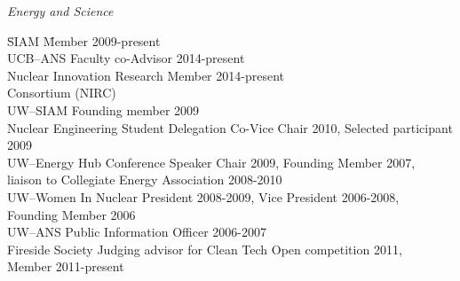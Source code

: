 \textit{Energy and Science}
\begin{tabbing}
\hspace*{2 em}\= SIAM  \hspace*{15em} \= Member 2009-present\\
%
\> UCB--ANS \> Faculty co-Advisor 2014-present  \\
%
\> Nuclear Innovation Research \> Member 2014-present\\
\> \hspace*{2 em} Consortium (NIRC) \\
%
\> UW--SIAM \> Founding member 2009\\
%
\> Nuclear Engineering Student Delegation \> Co-Vice Chair 2010, Selected participant 2009\\
%
\> UW--Energy Hub \> Conference Speaker Chair 2009, Founding Member 2007,  \\ \> \> liaison to Collegiate Energy Association 2008-2010\\
%
\> UW--Women In Nuclear \> President 2008-2009, Vice President 2006-2008,  \\ \> \> Founding Member 2006\\
%
\> UW--ANS \> Public Information Officer 2006-2007 \\
%
\> Fireside Society \> Judging advisor for Clean Tech Open competition 2011,  \\ \> \>Member 2011-present
\end{tabbing}

